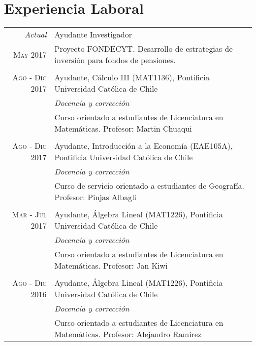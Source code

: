 \documentclass[a4paper,10pt]{article}
\begin{document}
\section{Experiencia Laboral}
\begin{tabular}{r|p{11cm}}
\emph{Actual}
 	&	Ayudante Investigador \\
\textsc{May 2017}
	&	\footnotesize{Proyecto FONDECYT. Desarrollo de estrategias de inversión para fondos de pensiones.}	\\

\multicolumn{2}{c}{} \\

\textsc{Ago - Dic 2017}
 	&	Ayudante, Cálculo III (MAT1136), Pontificia Universidad Católica de Chile \\
	&	\emph{Docencia y corrección}	\\
	&	\footnotesize{Curso orientado a estudiantes de Licenciatura en Matemáticas. Profesor: Martin Chuaqui}	\\

\multicolumn{2}{c}{} \\

\textsc{Ago - Dic 2017}
 	&	Ayudante, Introducción a la Economía (EAE105A), Pontificia Universidad Católica de Chile \\
	&	\emph{Docencia y corrección}	\\
	&	\footnotesize{Curso de servicio orientado a estudiantes de Geografía. Profesor: Pinjas Albagli}	\\

\multicolumn{2}{c}{} \\

\textsc{Mar - Jul 2017}
 	&	Ayudante, Álgebra Lineal (MAT1226), Pontificia Universidad Católica de Chile \\
	&	\emph{Docencia y corrección}	\\
	&	\footnotesize{Curso orientado a estudiantes de Licenciatura en Matemáticas. Profesor: Jan Kiwi}	\\

\multicolumn{2}{c}{} \\

\textsc{Ago - Dic 2016}
 	&	Ayudante, Álgebra Lineal (MAT1226), Pontificia Universidad Católica de Chile \\
	&	\emph{Docencia y corrección}	\\
	&	\footnotesize{Curso orientado a estudiantes de Licenciatura en Matemáticas. Profesor: Alejandro Ramirez}	\\


\end{tabular}
\end{document}

